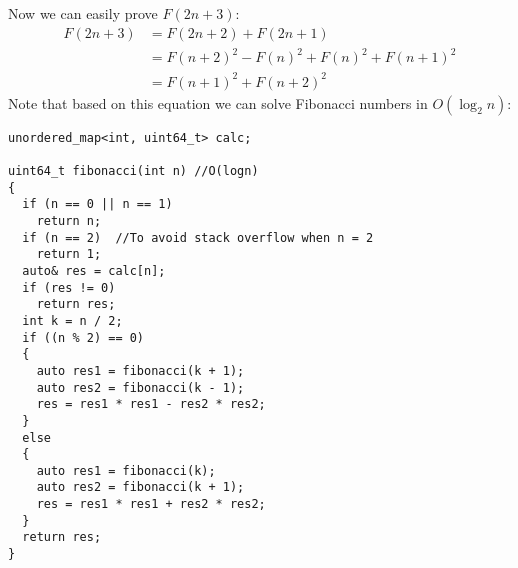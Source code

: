 \documentclass{book}
\begin{document}
	Now we can easily prove $F(2n + 3)$:
	\begin{equation*}
		\begin{split}
			F(2n + 3) &= F(2n + 2) + F(2n + 1) \\
			&= F(n + 2)^2 - F(n)^2 + F(n)^2 + F(n + 1)^2 \\
			&= F(n + 1)^2 + F(n + 2)^2
		\end{split}
	\end{equation*}
	Note that based on this equation we can solve Fibonacci numbers in $O(\log_2{n})$:
	\begin{lstlisting}
unordered_map<int, uint64_t> calc;

uint64_t fibonacci(int n) //O(logn)
{
  if (n == 0 || n == 1)
    return n;
  if (n == 2)  //To avoid stack overflow when n = 2
    return 1;
  auto& res = calc[n];
  if (res != 0)
    return res;
  int k = n / 2;
  if ((n % 2) == 0)
  {
    auto res1 = fibonacci(k + 1);
    auto res2 = fibonacci(k - 1);
    res = res1 * res1 - res2 * res2;
  }
  else
  {
    auto res1 = fibonacci(k);
    auto res2 = fibonacci(k + 1);
    res = res1 * res1 + res2 * res2;
  }
  return res;
}
	\end{lstlisting}
\end{document}
